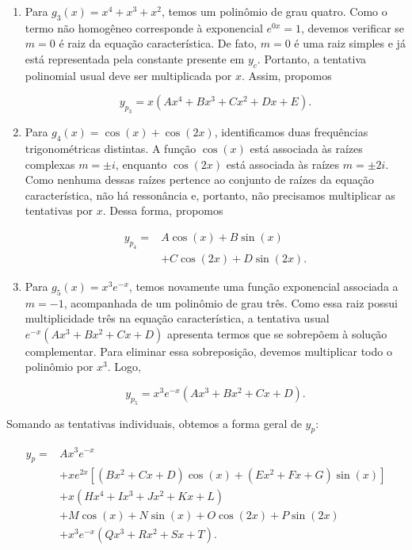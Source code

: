 {\begin{enumerate}
    \item Para $g_3(x)=x^4+x^3+x^2$, temos um polinômio de grau quatro.
    Como o termo não homogêneo corresponde à exponencial $e^{0x}=1$,
    devemos verificar se $m=0$ é raiz da equação característica.
    De fato, $m=0$ é uma raiz simples e já está representada pela
    constante presente em $y_c$. Portanto, a tentativa polinomial
    usual deve ser multiplicada por $x$. Assim, propomos
  
    \begin{equation*}
      y_{p_3}=x(Ax^4+Bx^3+Cx^2+Dx+E).
    \end{equation*}
  
    \item Para $g_4(x)=\cos(x)+\cos(2x)$, identificamos duas frequências
    trigonométricas distintas. A função $\cos(x)$ está associada às
    raízes complexas $m=\pm i$, enquanto $\cos(2x)$ está associada
    às raízes $m=\pm 2i$. Como nenhuma dessas raízes pertence ao
    conjunto de raízes da equação característica, não há
    ressonância e, portanto, não precisamos multiplicar as tentativas
    por $x$. Dessa forma, propomos
  
    \begin{equation*}
      \begin{aligned}
        y_{p_4}={}&A\cos(x)+B\sin(x)\\
        &+C\cos(2x)+D\sin(2x).
      \end{aligned}
    \end{equation*}
  
    \item Para $g_5(x)=x^3e^{-x}$, temos novamente uma função
    exponencial associada a $m=-1$, acompanhada de um polinômio de
    grau três. Como essa raiz possui multiplicidade três na equação
    característica, a tentativa usual
    $e^{-x}(Ax^3+Bx^2+Cx+D)$ apresenta termos que se sobrepõem à
    solução complementar. Para eliminar essa sobreposição, devemos
    multiplicar todo o polinômio por $x^3$. Logo,

    \begin{equation*}
      y_{p_5}=x^3e^{-x}(Ax^3+Bx^2+Cx+D).
    \end{equation*}
  \end{enumerate}
  
  Somando as tentativas individuais, obtemos a forma geral de $y_p$:

  \begin{equation*}
    \begin{aligned}
      y_p ={}&
      Ax^3e^{-x} \\[4pt]
      &+ xe^{2x}\left[
        (Bx^2+Cx+D)\cos(x)
        +(Ex^2+Fx+G)\sin(x)
      \right] \\[4pt]
      &+ x(Hx^4+Ix^3+Jx^2+Kx+L) \\[4pt]
      &+ M\cos(x)+N\sin(x)
        +O\cos(2x)+P\sin(2x) \\[4pt]
      &+ x^3e^{-x}(Qx^3+Rx^2+Sx+T).
    \end{aligned}
  \end{equation*}

}
